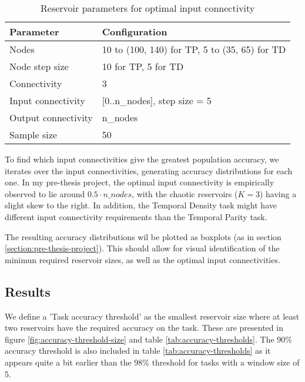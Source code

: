 \begin{table}[ht]
    \centering
    \caption{Reservoir parameters for optimal input connectivity}
    \label{tab:ic-reservoir-parameters}
    \begin{tabular}{ll}
        \hline
        \textbf{Parameter} & \textbf{Configuration} \\
        \hline
        \hline
        Nodes               & 10 to (100, 140) for TP, 5 to (35, 65) for TD \\
        Node step size      & 10 for TP, 5 for TD \\
        Connectivity        & 3                              \\
        Input connectivity  & [0..n\_nodes], step size = 5   \\
        Output connectivity & n\_nodes                       \\
        Sample size         & 50 \\
        \hline
    \end{tabular}
\end{table}

To find which input connectivities give the greatest population accuracy,
we iterates over the input connectivities, generating accuracy distributions for each one.
In my pre-thesis project,
the optimal input connectivity is empirically observed to lie around $ 0.5 \cdot n\_nodes $,
with the chaotic reservoirs ($K=3$) having a slight skew to the right.
In addition,
the Temporal Density task might have different input connectivity requirements than the Temporal Parity task.

The resulting accuracy distributions wil be plotted as boxplots (as in section \ref{section:pre-thesis-project}).
This should allow for visual identification of the minimun required reservoir sizes,
as well as the optimal input connectivities.

\subsection{Results}

We define a 'Task accuracy threshold' as the smallest reservoir size where at least two reservoirs have the required accuracy on the task.
These are presented in figure \ref{fig:accuracy-threshold-size} and table \ref{tab:accuracy-thresholds}.
The 90\% accuracy threshold is also included in table \ref{tab:accuracy-thresholds} as it appears quite a bit earlier than the 98\% threshold for tasks with a window size of 5.

